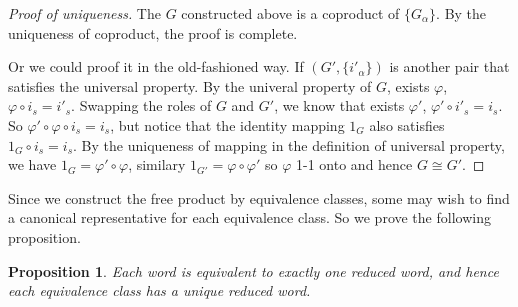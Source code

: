 \documentclass[a4paper,titlepage]{article}
\theoremstyle{remark}
\theoremstyle{definition}
\theoremstyle{definition}
\theoremstyle{plain}
\newtheorem{proposition}{Proposition}
\begin{document}
  \begin{proof}[Proof of uniqueness]
    The $G$ constructed above is a coproduct of $\{G_\alpha\}$. By the uniqueness of coproduct, the proof is complete.

    Or we could proof it in the old-fashioned way. If $(G', \{i'_\alpha\})$ is another pair that satisfies
    the universal property. By the univeral property of $G$, exists $\varphi$, $\varphi \circ i_s = i'_s$.
    Swapping the roles of $G$ and $G'$, we know that exists $\varphi'$, $\varphi' \circ i'_s = i_s$.
    So $\varphi' \circ \varphi \circ i_s = i_s$, but notice that the identity mapping $1_G$ also
    satisfies $1_G \circ i_s = i_s$. By the uniqueness of mapping in the definition of
    universal property, we have $1_G = \varphi' \circ \varphi$, similary $1_{G'} = \varphi \circ \varphi'$
    so $\varphi$ 1-1 onto and hence $G \cong G'$.
  \end{proof}

  Since we construct the free product by equivalence classes, some may wish to find a canonical
  representative for each equivalence class. So we prove the following proposition.

  \begin{proposition}
    Each word is equivalent to exactly one reduced word, and hence each equivalence class
    has a unique reduced word.
  \end{proposition}
\end{document}
